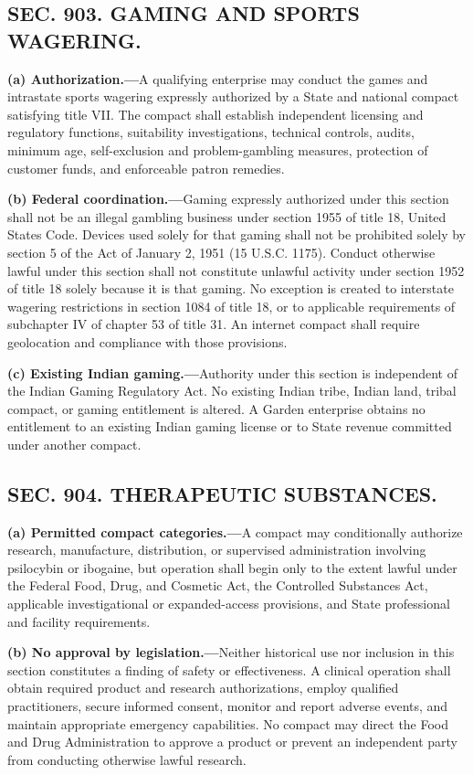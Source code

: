 \documentclass[12pt,letterpaper]{article}
\begin{document}
\subsection*{SEC. 903. GAMING AND SPORTS WAGERING.}

\textbf{(a) Authorization.---}A qualifying enterprise may conduct the games and intrastate sports wagering expressly authorized by a State and national compact satisfying title VII. The compact shall establish independent licensing and regulatory functions, suitability investigations, technical controls, audits, minimum age, self-exclusion and problem-gambling measures, protection of customer funds, and enforceable patron remedies.

\textbf{(b) Federal coordination.---}Gaming expressly authorized under this section shall not be an illegal gambling business under section 1955 of title 18, United States Code. Devices used solely for that gaming shall not be prohibited solely by section 5 of the Act of January 2, 1951 (15 U.S.C. 1175). Conduct otherwise lawful under this section shall not constitute unlawful activity under section 1952 of title 18 solely because it is that gaming. No exception is created to interstate wagering restrictions in section 1084 of title 18, or to applicable requirements of subchapter IV of chapter 53 of title 31. An internet compact shall require geolocation and compliance with those provisions.

\textbf{(c) Existing Indian gaming.---}Authority under this section is independent of the Indian Gaming Regulatory Act. No existing Indian tribe, Indian land, tribal compact, or gaming entitlement is altered. A Garden enterprise obtains no entitlement to an existing Indian gaming license or to State revenue committed under another compact.

\subsection*{SEC. 904. THERAPEUTIC SUBSTANCES.}

\textbf{(a) Permitted compact categories.---}A compact may conditionally authorize research, manufacture, distribution, or supervised administration involving psilocybin or ibogaine, but operation shall begin only to the extent lawful under the Federal Food, Drug, and Cosmetic Act, the Controlled Substances Act, applicable investigational or expanded-access provisions, and State professional and facility requirements.

\textbf{(b) No approval by legislation.---}Neither historical use nor inclusion in this section constitutes a finding of safety or effectiveness. A clinical operation shall obtain required product and research authorizations, employ qualified practitioners, secure informed consent, monitor and report adverse events, and maintain appropriate emergency capabilities. No compact may direct the Food and Drug Administration to approve a product or prevent an independent party from conducting otherwise lawful research.
\end{document}
